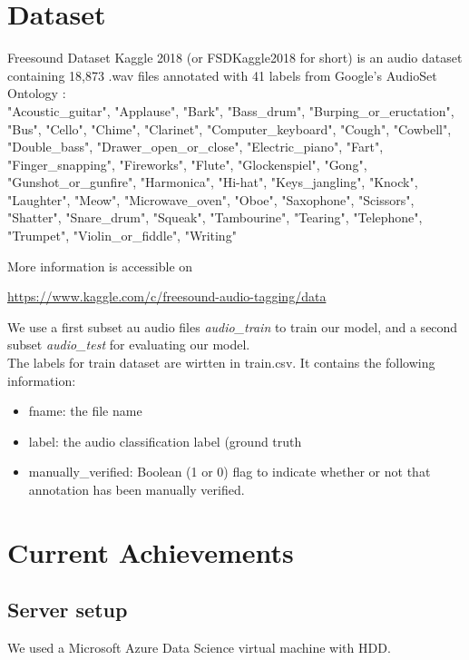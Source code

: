 \documentclass{article} %
\begin{document}
\section{Dataset}
	Freesound Dataset Kaggle 2018 (or FSDKaggle2018 for short) is an audio dataset containing 18,873 .wav files annotated with 41 labels from Google's AudioSet Ontology \cite{cite1}:\\

		"Acoustic\_guitar", "Applause", "Bark", "Bass\_drum", "Burping\_or\_eructation", "Bus", "Cello", "Chime", "Clarinet", "Computer\_keyboard", "Cough", "Cowbell", "Double\_bass", "Drawer\_open\_or\_close", "Electric\_piano", "Fart", "Finger\_snapping", "Fireworks", "Flute", "Glockenspiel", "Gong", "Gunshot\_or\_gunfire", "Harmonica", "Hi-hat", "Keys\_jangling", "Knock", "Laughter", "Meow", "Microwave\_oven", "Oboe", "Saxophone", "Scissors", "Shatter", "Snare\_drum", "Squeak", "Tambourine", "Tearing", "Telephone", "Trumpet", "Violin\_or\_fiddle", "Writing"\\
		\newline

	More information is accessible on 
	\begin{center} 
	\url{https://www.kaggle.com/c/freesound-audio-tagging/data}
	\end{center}

	We use a first subset au audio files \emph{audio_train} to train our model, and a second subset \emph{audio_test} for evaluating our model.\\
	The labels for train dataset are wirtten in train.csv. It contains the following information:
		\begin{itemize}
		    \item fname: the file name
		    \item label: the audio classification label (ground truth
		    \item manually\_verified: Boolean (1 or 0) flag to indicate whether or not that annotation has been manually verified.
		\end{itemize}


\section{Current Achievements}
	\subsection{Server setup}
		We used a Microsoft Azure Data Science virtual machine with HDD.
\end{document}
